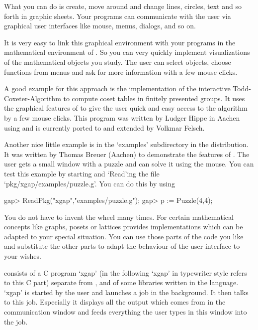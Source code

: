 What you can do is create, move around and change lines, circles, text and
so forth in graphic sheets. Your programs can communicate with the user via
graphical user interfaces like mouse, menus, dialogs, and so on.

It is very easy to link this graphical environment with your programs in
the mathematical environment of {\GAP}. So you can very quickly implement
visualizations of the mathematical objects you study. The user can select
objects, choose functions from menus and ask for more information with a
few mouse clicks. 

A good example for this approach is the implementation of the interactive
Todd-Coxeter-Algorithm to compute coset tables in finitely presented
groups. It uses the graphical features of {\XGAP} to give the user quick
and easy access to the algorithm by a few mouse clicks. This program was
written by Ludger Hippe in Aachen using {} and is currently ported to
{} and extended by Volkmar Felsch.

Another nice little example is in the `examples' subdirectory in the
{\XGAP} distribution. It was written by Thomas Breuer (Aachen) to
demonstrate the features of {\XGAP}. The user gets a small window with a
puzzle and can solve it using the mouse. You can test this example by
starting {\XGAP} and `Read'ing the file `pkg/xgap/examples/puzzle.g'.
You can do this by using

\begintt
gap> ReadPkg("xgap","examples/puzzle.g");
gap> p := Puzzle(4,4);
\endtt

You do not have to invent the wheel many times. For certain mathematical
concepts like graphs, posets or lattices {\XGAP} provides implementations
which can  
be adapted to your special situation. You can use those parts of the code
you like and substitute the other parts to adapt the behaviour of the user
interface to your wishes.



{\XGAP} consists of a C program `xgap' (in the following `xgap' in
typewriter style refers to this C part) separate from {\GAP}, and of some
libraries written in the {\GAP} language. `xgap' is started by the
user and launches a {\GAP} job in the background. It then talks 
to this {\GAP} job. Especially it displays all the output which comes from
{\GAP} in the communication window and feeds everything the user types in
this window into the {\GAP} job. 

